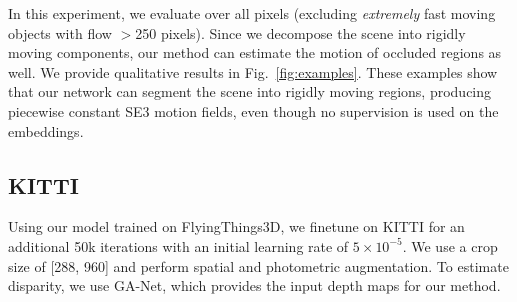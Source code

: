 \documentclass[final]{cvpr}
\begin{document}
In this experiment, we evaluate over all pixels (excluding \emph{extremely} fast moving objects with flow $>$250 pixels). Since we decompose the scene into rigidly moving components, our method can estimate the motion of occluded regions as well. We provide qualitative results in Fig.~\ref{fig:examples}. These examples show that our network can segment the scene into rigidly moving regions, producing piecewise constant SE3 motion fields, even though no supervision is used on the embeddings.

\subsection{KITTI}
Using our model trained on FlyingThings3D, we finetune on KITTI for an additional 50k iterations with an initial learning rate of $5\times10^{-5}$. We use a crop size of [288, 960] and perform spatial and photometric augmentation. To estimate disparity, we use GA-Net\cite{zhang2019ga}, which provides the input depth maps for our method.

\begin{table*}
\centering
{}
\caption{Ablation experiments, details of the individual experiments are provided in \ref{sec:ablations}}
\label{table:ablations}
\end{table*}
\end{document}
